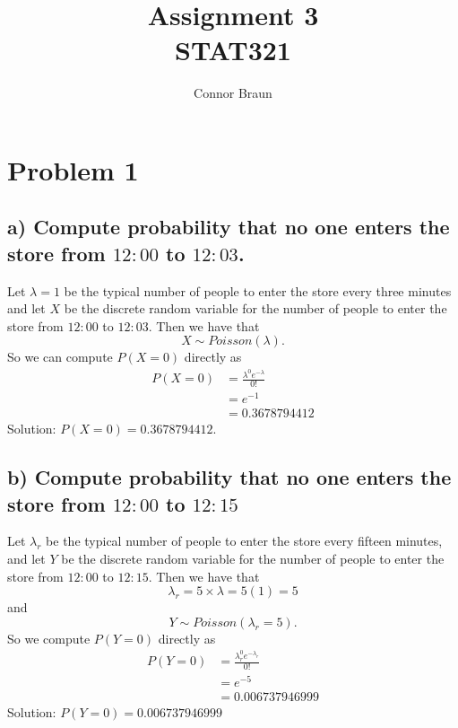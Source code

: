 \documentclass[11pt, letterpaper]{article}
\begin{document}
\title{Assignment 3\\\normalsize STAT321}
\author{Connor Braun}

\allowdisplaybreaks

\maketitle

\section*{Problem 1}
\subsection*{a) \normalfont Compute probability that no one enters the store from $12:00$ to $12:03$.}
Let $\lambda=1$ be the typical number of people to enter the store every three minutes and 
let $X$ be the discrete random variable for the number of people to enter the store from $12:00$ to $12:03$.
Then we have that
\[X\sim Poisson(\lambda).\]
So we can compute $P(X=0)$ directly as
\begin{align*}
    P(X=0)&=\frac{\lambda^0e^{-\lambda}}{0!}\\
    &=e^{-1}\\
    &=0.3678794412
\end{align*}
Solution: $P(X=0)=0.3678794412$.
\subsection*{b) \normalfont Compute probability that no one enters the store from $12:00$ to $12:15$}
Let $\lambda_r$ be the typical number of people to enter the store every fifteen minutes, and let $Y$ be the 
discrete random variable for the number of people to enter the store from $12:00$ to $12:15$. 
Then we have that
\[\lambda_r=5\times\lambda=5(1)=5\]
and
\[Y\sim Poisson(\lambda_r=5).\]
So we compute $P(Y=0)$ directly as
\begin{align*}
    P(Y=0)&=\frac{\lambda_r^0e^{-\lambda_r}}{0!}\\
    &=e^{-5}\\
    &=0.006737946999
\end{align*}
Solution: $P(Y=0)=0.006737946999$
\end{document}
